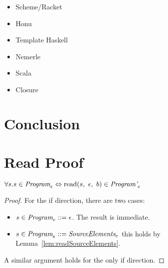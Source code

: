 \documentclass[preprint,10pt]{sigplanconf}
\begin{document}
\begin{itemize}
\item Scheme/Racket
\item Honu
\item Template Haskell
\item Nemerle
\item Scala
\item Closure
\end{itemize}
\section{Conclusion}
\label{sec-8}

\appendix

\clearpage

\section{Read Proof}

\begin{theorem}\mbox{}

  \( \forall s. s \in \textit{Program}_{e} \Leftrightarrow 
  \textrm{read}(s,~\epsilon,~b) \in \textit{Program'}_{e} \)

\end{theorem}
\begin{proof}

  For the if direction, there are two cases:
  \begin{itemize}
  \item \( s \in \textit{Program}_{e} ::= \epsilon \). The result is immediate.

  \item \( s \in \textit{Program}_{e} ::= \textit{SourceElements}_{e} \)
    this holds by Lemma~\ref{lem:readSourceElements}.
  \end{itemize}

  A similar argument holds for the only if direction.
\end{proof}
\end{document}
